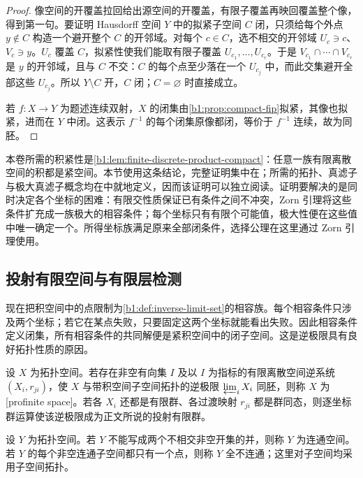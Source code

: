 \begin{proof}
	像空间的开覆盖拉回给出源空间的开覆盖，有限子覆盖再映回覆盖整个像，得到第一句。要证明 Hausdorff 空间 \(Y\) 中的拟紧子空间 \(C\) 闭，只须给每个外点 \(y\notin C\) 构造一个避开整个 \(C\) 的开邻域。对每个 \(c\in C\)，选不相交的开邻域 \(U_c\ni c\)、\(V_c\ni y\)。\(U_c\) 覆盖 \(C\)，拟紧性使我们能取有限子覆盖 \(U_{c_1},\ldots,U_{c_r}\)。于是 \(V_{c_1}\cap\cdots\cap V_{c_r}\) 是 \(y\) 的开邻域，且与 \(C\) 不交：\(C\) 的每个点至少落在一个 \(U_{c_j}\) 中，而此交集避开全部这些 \(U_{c_j}\)。所以 \(Y\setminus C\) 开，\(C\) 闭；\(C=\varnothing\) 时直接成立。

	若 \(f:X\rightarrow Y\) 为题述连续双射，\(X\) 的闭集由\cref{b1:prop:compact-fip}拟紧，其像也拟紧，进而在 \(Y\) 中闭。这表示 \(f^{-1}\) 的每个闭集原像都闭，等价于 \(f^{-1}\) 连续，故为同胚。
\end{proof}

本卷所需的积紧性是\cref{b1:lem:finite-discrete-product-compact}：任意一族有限离散空间的积都是紧空间。本节使用这条结论，完整证明集中在；所需的拓扑、真滤子与极大真滤子概念均在中就地定义，因而该证明可以独立阅读。证明要解决的是同时决定各个坐标的困难：有限交性质保证已有条件之间不冲突，Zorn 引理将这些条件扩充成一族极大的相容条件；每个坐标只有有限个可能值，极大性便在这些值中唯一确定一个。所得坐标族满足原来全部闭条件，选择公理在这里通过 Zorn 引理使用。

\subsection{投射有限空间与有限层检测}
\label{b1:subsec:A03:03}

现在把积空间中的点限制为\cref{b1:def:inverse-limit-set}的相容族。每个相容条件只涉及两个坐标；若它在某点失败，只要固定这两个坐标就能看出失败。因此相容条件定义闭集，所有相容条件的共同解便是紧积空间中的闭子空间。这是逆极限具有良好拓扑性质的原因。

\begin{definition}\label{b1:def:profinite-space}
	设 \(X\) 为拓扑空间。若存在非空有向集 \(I\) 及以 \(I\) 为指标的有限离散空间逆系统 \((X_i,r_{ji})\)，使 \(X\) 与带积空间子空间拓扑的逆极限 \(\varprojlim_iX_i\) 同胚，则称 \(X\) 为[profinite space]。若各 \(X_i\) 还都是有限群、各过渡映射 \(r_{ji}\) 都是群同态，则逐坐标群运算使该逆极限成为正文所说的投射有限群。
\end{definition}

\begin{samepage}
	设 \(Y\) 为拓扑空间。若 \(Y\) 不能写成两个不相交非空开集的并，则称 \(Y\) 为连通空间。若 \(Y\) 的每个非空连通子空间都只有一个点，则称 \(Y\) 全不连通；这里对子空间均采用子空间拓扑。
\end{samepage}

